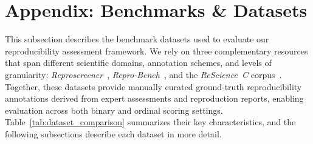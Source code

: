 \documentclass{article}
\begin{document}
\section{Appendix: Benchmarks \& Datasets} \label{appendix:benchmarks}

This subsection describes the benchmark datasets used to evaluate our reproducibility assessment framework. 
We rely on three complementary resources that span different scientific domains, annotation schemes, and levels of granularity: \textit{Reproscreener}~\citep{bhaskar2024reproscreener}, \textit{Repro-Bench}~\citep{hu2025repro}, and the \textit{ReScience~C} corpus~\citep{rougier2018rescience}. 
Together, these datasets provide manually curated ground-truth reproducibility annotations derived from expert assessments and reproduction reports, enabling evaluation across both binary and ordinal scoring settings. 
Table~\ref{tab:dataset_comparison} summarizes their key characteristics, and the following subsections describe each dataset in more detail.
\end{document}
